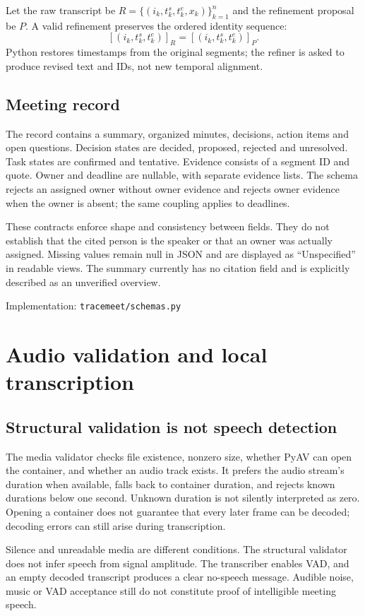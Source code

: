 \documentclass[11pt,a4paper]{article}
\newcommand{\code}[1]{\nolinkurl{#1}}
\newcommand{\src}[1]{\par{\footnotesize\raggedright\textcolor{accent}{Implementation:} #1\par}}
\begin{document}
Let the raw transcript be $R=\{(i_k,t_k^s,t_k^e,x_k)\}_{k=1}^{n}$ and the refinement proposal be $P$. A valid refinement preserves the ordered identity sequence:
\[
[(i_k,t_k^s,t_k^e)]_{R}=[(i_k,t_k^s,t_k^e)]_{P}.
\]
Python restores timestamps from the original segments; the refiner is asked to produce revised text and IDs, not new temporal alignment.

\subsection{Meeting record}
The record contains a summary, organized minutes, decisions, action items and open questions. Decision states are decided, proposed, rejected and unresolved. Task states are confirmed and tentative. Evidence consists of a segment ID and quote. Owner and deadline are nullable, with separate evidence lists. The schema rejects an assigned owner without owner evidence and rejects owner evidence when the owner is absent; the same coupling applies to deadlines.

These contracts enforce shape and consistency between fields. They do not establish that the cited person is the speaker or that an owner was actually assigned. Missing values remain null in JSON and are displayed as ``Unspecified'' in readable views. The summary currently has no citation field and is explicitly described as an unverified overview.
\src{\code{tracemeet/schemas.py}}

\section{Audio validation and local transcription}
\subsection{Structural validation is not speech detection}
The media validator checks file existence, nonzero size, whether PyAV can open the container, and whether an audio track exists. It prefers the audio stream's duration when available, falls back to container duration, and rejects known durations below one second. Unknown duration is not silently interpreted as zero. Opening a container does not guarantee that every later frame can be decoded; decoding errors can still arise during transcription.

Silence and unreadable media are different conditions. The structural validator does not infer speech from signal amplitude. The transcriber enables VAD, and an empty decoded transcript produces a clear no-speech message. Audible noise, music or VAD acceptance still do not constitute proof of intelligible meeting speech.
\end{document}
